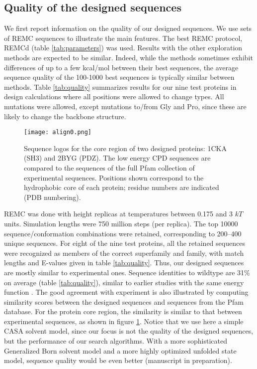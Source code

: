 \subsection{Quality of the designed sequences}
We first report information on the quality of our designed sequences. We use sets of REMC sequences to illustrate the main features. The best REMC protocol, REMCd (table \ref{tab:parameters}) was used. Results with the other exploration methods are expected to be similar. Indeed, while the methods sometimes exhibit differences of up to a few kcal/mol between their best sequences, the average sequence quality of the 100-1000 best sequences is typically similar between methods. Table \ref{tab:quality} summarizes results for our nine test proteins in design calculations where all positions were allowed to change types. All mutations were allowed, except mutations to/from Gly and Pro, since these are likely to change the backbone structure.
 
\begin{figure}[!htbp]
        \centering
  \texttt{[image: align0.png]} 
  \caption{
Sequence logos for the core region of two designed proteins: 1CKA (SH3) and 2BYG (PDZ). The low energy CPD sequences are compared to the sequences of the full Pfam collection of
experimental sequences. Positions shown correspond to the hydrophobic core of each protein; residue numbers are indicated (PDB numbering).
}
      \label{fig:logos}
\end{figure}

REMC was done with height replicas at temperatures between 0.175 and 3 $kT$ units. Simulation lengths were 750 million steps (per replica). The top 10000 sequence/conformation combinations were retained, corresponding to 200--400 unique sequences. For eight of the nine test proteins, all the retained sequences were recognized as members of the correct superfamily and family, with match lengths and E-values given in table \ref{tab:quality}. Thus, our designed sequences are mostly similar to experimental ones. Sequence identities to wildtype are 31\% on average (table \ref{tab:quality}), similar to earlier studies with the same energy function \cite{Schmidt09,Schmidt10}. The good agreement with experiment is also illustrated by computing similarity scores between the designed sequences and sequences from the Pfam database. For the protein core region, the similarity is similar to that between experimental sequences, as shown in figure \ref{fig:logos}. Notice that we use here a simple CASA solvent model, since our focus is not the quality of the designed sequences, but the performance of our search algorithms. With a more sophisticated Generalized Born solvent model and a more highly optimized unfolded state model, sequence quality would be even better (manuscript in preparation).

